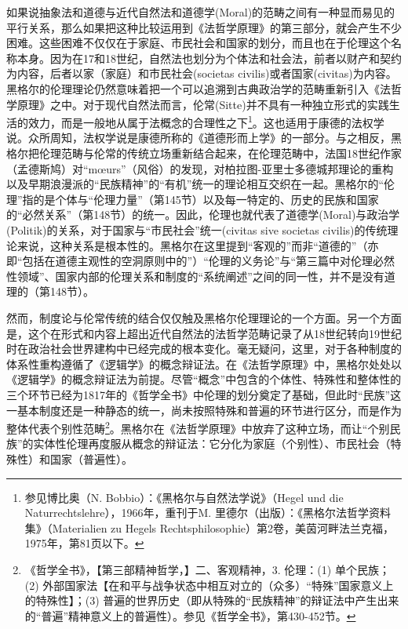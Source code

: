 如果说抽象法和道德与近代自然法和道德学(Moral)的范畴之间有一种显而易见的平行关系，那么如果把这种比较运用到《法哲学原理》的第三部分，就会产生不少困难。这些困难不仅仅在于家庭、市民社会和国家的划分，而且也在于伦理这个名称本身。因为在17和18世纪，自然法也划分为个体法和社会法，前者以财产和契约为内容，后者以家（家庭）和市民社会(societas civilis)或者国家(civitas)为内容。黑格尔的伦理理论仍然意味着把一个可以追溯到古典政治学的范畴重新引入《法哲学原理》之中。对于现代自然法而言，伦常(Sitte)并不具有一种独立形式的实践生活的效力，而是一般地从属于法概念的合理性之下\footnote{参见博比奥（N. Bobbio）：《黑格尔与自然法学说》（Hegel und die Naturrechtslehre），1966年，重刊于M. 里德尔（出版）：《黑格尔法哲学资料集》（Materialien zu Hegels Rechtsphilosophie）第2卷，美茵河畔法兰克福，1975年，第81页以下。}。这也适用于康德的法权学说。众所周知，法权学说是康德所称的《道德形而上学》的一部分。与之相反，黑格尔把伦理范畴与伦常的传统立场重新结合起来，在伦理范畴中，法国18世纪作家（孟德斯鸠）对“mœurs”（风俗）的发现，对柏拉图-亚里士多德城邦理论的重构以及早期浪漫派的“民族精神”的“有机”统一的理论相互交织在一起。黑格尔的“伦理”指的是个体与“伦理力量”（第145节）以及每一特定的、历史的民族和国家的“必然关系”（第148节）的统一。因此，伦理也就代表了道德学(Moral)与政治学(Politik)的关系，对于国家与“市民社会”统一(civitas sive societas civilis)的传统理论来说，这种关系是根本性的。黑格尔在这里提到“客观的”而非“道德的”（亦即“包括在道德主观性的空洞原则中的”）“伦理的义务论”与“第三篇中对伦理必然性领域”、国家内部的伦理关系和制度的“系统阐述”之间的同一性，并不是没有道理的（第148节）。

然而，制度论与伦常传统的结合仅仅触及黑格尔伦理理论的一个方面。另一个方面是，这个在形式和内容上超出近代自然法的法哲学范畴记录了从18世纪转向19世纪时在政治社会世界建构中已经完成的根本变化。毫无疑问，这里，对于各种制度的体系性重构遵循了《逻辑学》的概念辩证法。在《法哲学原理》中，黑格尔处处以《逻辑学》的概念辩证法为前提。尽管“概念”中包含的个体性、特殊性和整体性的三个环节已经为1817年的《哲学全书》中伦理的划分奠定了基础，但此时“民族”这一基本制度还是一种静态的统一，尚未按照特殊和普遍的环节进行区分，而是作为整体代表个别性范畴\footnote{《哲学全书》，【第三部精神哲学，】二、客观精神，3. 伦理：(1) 单个民族；(2) 外部国家法【在和平与战争状态中相互对立的（众多）“特殊”国家意义上的特殊性】；(3) 普遍的世界历史（即从特殊的“民族精神”的辩证法中产生出来的“普遍”精神意义上的普遍性）。参见《哲学全书》，第430-452节。}。黑格尔在《法哲学原理》中放弃了这种立场，而让“个别民族”的实体性伦理再度服从概念的辩证法：它分化为家庭（个别性）、市民社会（特殊性）和国家（普遍性）。

